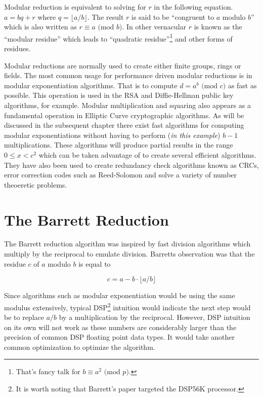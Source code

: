 \documentclass[b5paper]{book}
\begin{document}
Modular reduction is equivalent to solving for $r$ in the following equation.  $a = bq + r$ where $q = \lfloor a/b \rfloor$.  The result 
$r$ is said to be ``congruent to $a$ modulo $b$'' which is also written as $r \equiv a \mbox{ (mod }b\mbox{)}$.  In other vernacular $r$ is known as the 
``modular residue'' which leads to ``quadratic residue''\footnote{That's fancy talk for $b \equiv a^2 \mbox{ (mod }p\mbox{)}$.} and
other forms of residues.  

Modular reductions are normally used to create either finite groups, rings or fields.  The most common usage for performance driven modular reductions 
is in modular exponentiation algorithms.  That is to compute $d = a^b \mbox{ (mod }c\mbox{)}$ as fast as possible.  This operation is used in the 
RSA and Diffie-Hellman public key algorithms, for example.  Modular multiplication and squaring also appears as a fundamental operation in 
Elliptic Curve cryptographic algorithms.  As will be discussed in the subsequent chapter there exist fast algorithms for computing modular 
exponentiations without having to perform (\textit{in this example}) $b - 1$ multiplications.  These algorithms will produce partial results in the 
range $0 \le x < c^2$ which can be taken advantage of to create several efficient algorithms.   They have also been used to create redundancy check 
algorithms known as CRCs, error correction codes such as Reed-Solomon and solve a variety of number theoeretic problems.  

\section{The Barrett Reduction}
The Barrett reduction algorithm \cite{BARRETT} was inspired by fast division algorithms which multiply by the reciprocal to emulate
division.  Barretts observation was that the residue $c$ of $a$ modulo $b$ is equal to 

\begin{equation}
c = a - b \cdot \lfloor a/b \rfloor
\end{equation}

Since algorithms such as modular exponentiation would be using the same modulus extensively, typical DSP\footnote{It is worth noting that Barrett's paper 
targeted the DSP56K processor.}  intuition would indicate the next step would be to replace $a/b$ by a multiplication by the reciprocal.  However, 
DSP intuition on its own will not work as these numbers are considerably larger than the precision of common DSP floating point data types.  
It would take another common optimization to optimize the algorithm.
\end{document}
